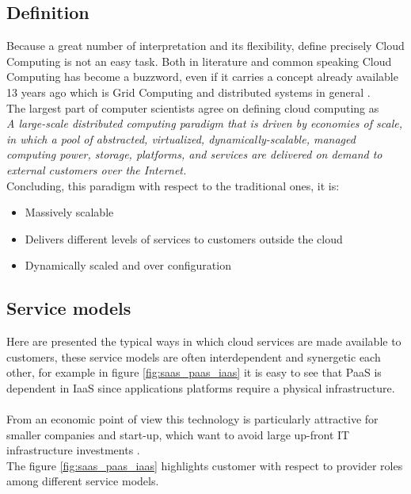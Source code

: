 \subsection{Definition}
Because a great number of interpretation and its flexibility, define precisely Cloud Computing is not an easy task. Both in literature and common speaking Cloud Computing has become a buzzword, even if it carries a concept already available 13 years ago which is Grid Computing and distributed systems in general \cite{foster}.\\
The largest part of computer scientists agree on defining cloud computing as\\
\textit{A large-scale distributed computing paradigm that is driven by economies of scale, in which a pool of abstracted, virtualized, dynamically-scalable, managed computing power, storage, platforms, and services are delivered on demand to external customers over the Internet.}\cite{foster}\\
Concluding, this paradigm with respect to the traditional ones, it is:
\begin{itemize}
    \item Massively scalable
    \item Delivers different levels of services to customers outside the cloud
    \item Dynamically scaled and over configuration
\end{itemize}

\subsection{Service models}
Here are presented the typical ways in which cloud services are made available to customers, these service models are often interdependent and synergetic each other, for example in figure \ref{fig:saas_paas_iaas} it is easy to see that PaaS is dependent in IaaS since applications platforms require a physical infrastructure.\\ \\
From an economic point of view this technology is particularly attractive for smaller companies and start-up, which want to avoid large up-front IT infrastructure investments \cite{CloudComputingModels}.\\
The figure \ref{fig:saas_paas_iaas} highlights customer with respect to provider roles among different service models.

